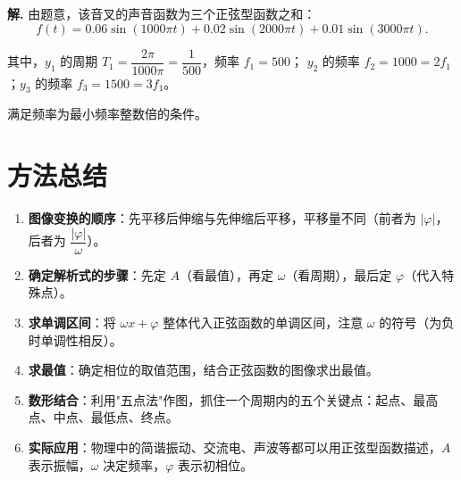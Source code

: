 \documentclass[11pt]{ctexrep}
\begin{document}
\textbf{解.} 由题意，该音叉的声音函数为三个正弦型函数之和：
\[
    f(t) = 0.06\sin(1000\pi t) + 0.02\sin(2000\pi t) + 0.01\sin(3000\pi t).
\]

其中，$y_1$ 的周期 $T_1 = \dfrac{2\pi}{1000\pi} = \dfrac{1}{500}$，频率 $f_1 = 500$；
$y_2$ 的频率 $f_2 = 1000 = 2f_1$；$y_3$ 的频率 $f_3 = 1500 = 3f_1$。

满足频率为最小频率整数倍的条件。

\section*{方法总结}

\begin{enumerate}
    \item \textbf{图像变换的顺序}：先平移后伸缩与先伸缩后平移，平移量不同（前者为 $|\varphi|$，后者为 $\dfrac{|\varphi|}{\omega}$）。
    \item \textbf{确定解析式的步骤}：先定 $A$（看最值），再定 $\omega$（看周期），最后定 $\varphi$（代入特殊点）。
    \item \textbf{求单调区间}：将 $\omega x + \varphi$ 整体代入正弦函数的单调区间，注意 $\omega$ 的符号（为负时单调性相反）。
    \item \textbf{求最值}：确定相位的取值范围，结合正弦函数的图像求出最值。
    \item \textbf{数形结合}：利用"五点法"作图，抓住一个周期内的五个关键点：起点、最高点、中点、最低点、终点。
    \item \textbf{实际应用}：物理中的简谐振动、交流电、声波等都可以用正弦型函数描述，$A$ 表示振幅，$\omega$ 决定频率，$\varphi$ 表示初相位。
\end{enumerate}
\end{document}
